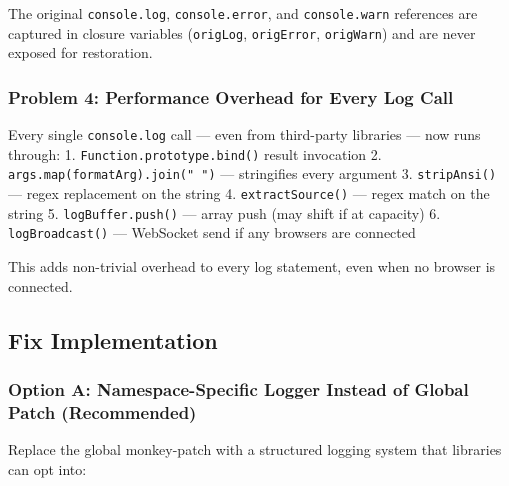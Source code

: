 The original \texttt{console.log}, \texttt{console.error}, and \texttt{console.warn} references are captured in closure variables (\texttt{origLog}, \texttt{origError}, \texttt{origWarn}) and are never exposed for restoration.

\subsubsection*{Problem 4: Performance Overhead for Every Log Call}

Every single \texttt{console.log} call — even from third-party libraries — now runs through:
1. \texttt{Function.prototype.bind()} result invocation
2. \texttt{args.map(formatArg).join(" ")} — stringifies every argument
3. \texttt{stripAnsi()} — regex replacement on the string
4. \texttt{extractSource()} — regex match on the string
5. \texttt{logBuffer.push()} — array push (may shift if at capacity)
6. \texttt{logBroadcast()} — WebSocket send if any browsers are connected

This adds non-trivial overhead to every log statement, even when no browser is connected.


\subsection*{Fix Implementation}
\subsubsection*{Option A: Namespace-Specific Logger Instead of Global Patch (Recommended)}

Replace the global monkey-patch with a structured logging system that libraries can opt into:



